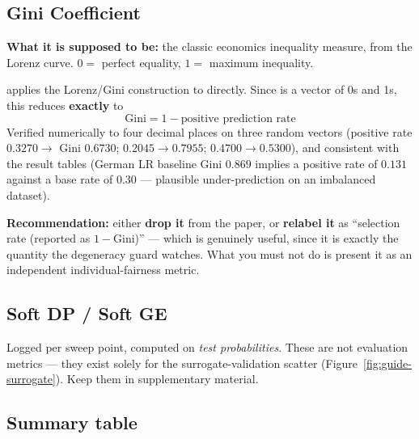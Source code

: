 \subsection{Gini Coefficient}

\textbf{What it is supposed to be:} the classic economics inequality measure,
from the Lorenz curve. $0 =$ perfect equality, $1 =$ maximum inequality.

\begin{warnbox}
 applies the Lorenz/Gini construction to
 directly. Since  is a vector of 0s and 1s, this
reduces \textbf{exactly} to
\[ \mathrm{Gini} = 1 - \text{positive prediction rate} \]
Verified numerically to four decimal places on three random vectors (positive
rate $0.3270 \to$ Gini $0.6730$; $0.2045 \to 0.7955$; $0.4700 \to 0.5300$), and
consistent with the result tables (German LR baseline Gini $0.869$ implies a
positive rate of $0.131$ against a base rate of $0.30$ --- plausible
under-prediction on an imbalanced dataset).

\textbf{Recommendation:} either \textbf{drop it} from the paper, or
\textbf{relabel it} as ``selection rate (reported as $1-$Gini)'' --- which is
genuinely useful, since it is exactly the quantity the degeneracy guard
watches. What you must not do is present it as an independent
individual-fairness metric.
\end{warnbox}

\subsection{Soft DP / Soft GE}

Logged per sweep point, computed on \emph{test probabilities}. These are not
evaluation metrics --- they exist solely for the surrogate-validation scatter
(Figure~\ref{fig:guide-surrogate}). Keep them in supplementary material.

\subsection{Summary table}


